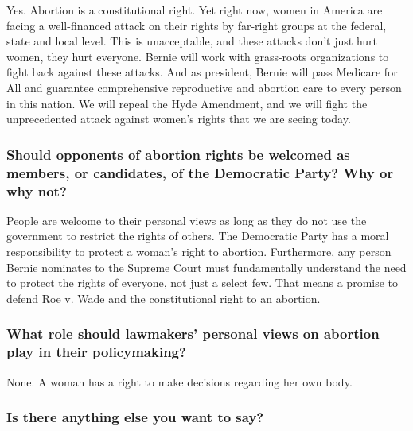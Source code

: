 Yes. Abortion is a constitutional right. Yet right now, women in America
are facing a well-financed attack on their rights by far-right groups at
the federal, state and local level. This is unacceptable, and these
attacks don't just hurt women, they hurt everyone. Bernie will work with
grass-roots organizations to fight back against these attacks. And as
president, Bernie will pass Medicare for All and guarantee comprehensive
reproductive and abortion care to every person in this nation. We will
repeal the Hyde Amendment, and we will fight the unprecedented attack
against women's rights that we are seeing today.

\hypertarget{should-opponents-of-abortion-rights-be-welcomed-as-members-or-candidates-of-the-democratic-party-why-or-why-not-4}{%
\subsubsection{Should opponents of abortion rights be welcomed as
members, or candidates, of the Democratic Party? Why or why
not?}\label{should-opponents-of-abortion-rights-be-welcomed-as-members-or-candidates-of-the-democratic-party-why-or-why-not-4}}

People are welcome to their personal views as long as they do not use
the government to restrict the rights of others. The Democratic Party
has a moral responsibility to protect a woman's right to abortion.
Furthermore, any person Bernie nominates to the Supreme Court must
fundamentally understand the need to protect the rights of everyone, not
just a select few. That means a promise to defend Roe v. Wade and the
constitutional right to an abortion.

\hypertarget{what-role-should-lawmakers-personal-views-on-abortion-play-in-their-policymaking-4}{%
\subsubsection{What role should lawmakers' personal views on abortion
play in their
policymaking?}\label{what-role-should-lawmakers-personal-views-on-abortion-play-in-their-policymaking-4}}

None. A woman has a right to make decisions regarding her own body.

\hypertarget{is-there-anything-else-you-want-to-say-4}{%
\subsubsection{Is there anything else you want to
say?}\label{is-there-anything-else-you-want-to-say-4}}

